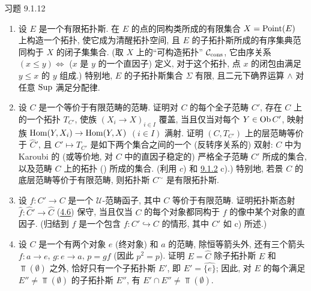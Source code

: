 \begin{enonce*}[remark]{习题 9.1.12}
\begin{enumerate}
\item 设 $E$ 是一个有限拓扑斯.
在 $E$ 的点的同构类所成的有限集合 $X=\operatorname{Point}(E)$ 上构造一个拓扑,
使它成为清醒拓扑空间,
且 $E$ 的子拓扑斯所成的有序集典范同构于 $X$ 的闭子集集合.
(取 $X$ 上的“可构造拓扑” ${\mathcal C}_{\operatorname{cons}}$,
它由序关系 $(x\leq y)\Leftrightarrow$
($x$ 是 $y$ 的一个直因子) 定义,
对于这个拓扑, 点 $x$ 的闭包由满足 $y\leq x$ 的 $y$ 组成.)
特别地, $E$ 的子拓扑斯集合 $\Sigma$ 有限,
且二元下确界运算 $\wedge$ 对任意 $\operatorname{Sup}$ 满足分配律.

\item 设 $C$ 是一个等价于有限范畴的范畴.
证明对 $C$ 的每个全子范畴 $C'$,
存在 $C$ 上的一个拓扑 $T_{C'}$,
使族 $(X_i\rightarrow X)_{i\in I}$ 覆盖,
当且仅当对每个 $Y\in\operatorname{Ob} C'$,
映射族 $\operatorname{Hom}(Y,X_i)\rightarrow\operatorname{Hom}(Y,X)$ $(i\in I)$ 满射.
证明 $(C,T_{C'})$ 上的层范畴等价于 $\widehat{C}'$,
且 $C'\mapsto T_{C'}$ 是如下两个集合之间的一个 (反转序关系的) 双射:
$C$ 中为 Karoubi 的
(或等价地, 对 $C$ 中的直因子稳定的) 严格全子范畴 $C'$ 所成的集合,
以及范畴 $C$ 上的拓扑 () 所成的集合.
(利用 $c$) 和 \hyperref[IV.rem9.1.2]{9.1.2} c).)\pageoriginale
特别地, 若景 $C$ 的底层范畴等价于有限范畴,
则拓扑斯 $C^{\sim}$ 是有限拓扑斯.

\item 设 $f:C'\rightarrow C$ 是一个 $𝒰$-范畴函子,
其中 $C$ 等价于有限范畴.
证明拓扑斯态射 $\widehat{f}:\widehat{C}'\rightarrow \widehat{C}$
(\hyperref[IV.subsec4.6]{4.6}) 保守,
当且仅当 $C$ 的每个对象都同构于 $f$ 的像中某个对象的直因子.
(归结到 $f$ 是一个包含 $f:C'\hookrightarrow C$ 的情形,
其中 $C'$ 如 c) 所述.)

\item 设 $C$ 是一个有两个对象 $e$ (终对象) 和 $a$ 的范畴,
除恒等箭头外, 还有三个箭头 $f:a\rightarrow e$,
$g:e\rightarrow a$, $p=gf$ (因此 $p^2=p$).
证明 $E=\widehat{C}$ 除子拓扑斯 $E$ 和 $\Top(∅)$ 之外,
恰好只有一个子拓扑斯 $E'$, 即 $E'=\widehat{\{e\}}$;
因此, 对 $E$ 的每个满足 $E''\neq\Top(∅)$ 的子拓扑斯 $E''$,
有 $E'\cap E''\neq\Top(∅)$.
\end{enumerate}
\end{enonce*}



